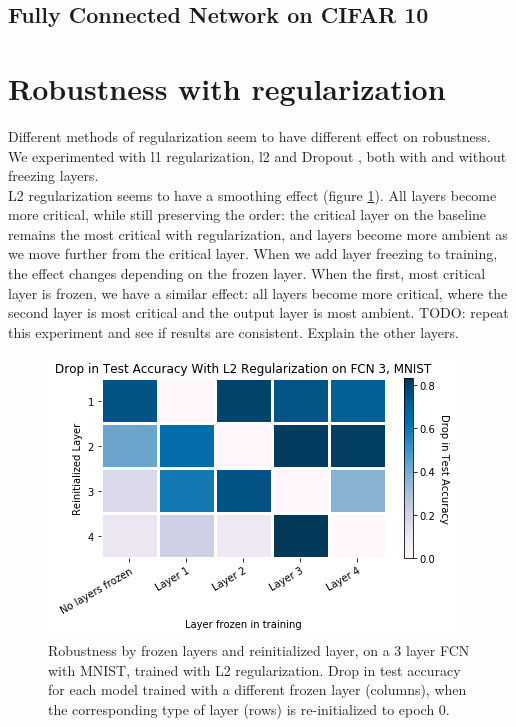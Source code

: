 \documentclass{article}
\begin{document}
\subsection{Fully Connected Network on CIFAR 10}
\section{Robustness with regularization} \label{regularization}
Different methods of regularization seem to have different effect on robustness. We experimented with l1 regularization, l2 and Dropout \cite{dropout}, both with and without freezing layers.\\
L2 regularization seems to have a smoothing effect (figure \ref{fig:fc3_l2_drop_by_layer_type}). All layers become more critical, while still preserving the order: the critical layer on the baseline remains the most critical with regularization, and layers become more ambient as we move further from the critical layer. When we add layer freezing to training, the effect changes depending on the frozen layer. When the first, most critical layer is frozen, we have a similar effect: all layers become more critical, where the second layer is most critical and the output layer is most ambient. TODO: repeat this experiment and see if results are consistent. Explain the other layers.\\


\begin{figure}
  \includegraphics[width=\linewidth]{images/fc3_mnist_l2_reg_drop_in_acc_by_layer.png}
  \caption{Robustness by frozen layers and reinitialized layer, on a 3 layer FCN with MNIST, trained with L2 regularization. Drop in test accuracy for each model trained with a different frozen layer (columns), when the corresponding type of layer (rows) is re-initialized to epoch 0.}
  \label{fig:fc3_l2_drop_by_layer_type}
\end{figure}        
\end{document}
